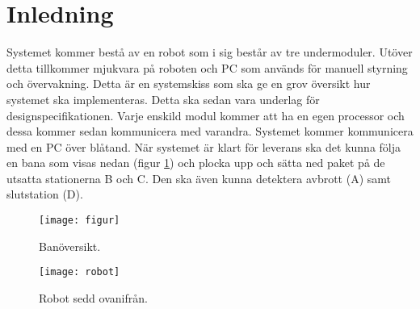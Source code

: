 \section{Inledning}
Systemet kommer bestå av en robot som i sig består av tre undermoduler. Utöver detta tillkommer mjukvara på roboten och PC som används för manuell styrning och övervakning. Detta är en systemskiss som ska ge en grov översikt hur systemet ska implementeras. Detta ska sedan vara underlag för designspecifikationen. 
\newline
\newline
Varje enskild modul kommer att ha en egen processor och dessa kommer sedan kommunicera med varandra. Systemet kommer kommunicera med en PC över blåtand. När systemet är klart för leverans ska det kunna följa en bana som visas nedan (figur \ref{systemskiss:banoversikt}) och plocka upp och sätta ned paket på de utsatta stationerna B och C. Den ska även kunna detektera avbrott (A) samt slutstation (D). 

\begin{figure}[h]
\center
\texttt{[image: figur]}
\caption{Banöversikt.} \label{systemskiss:banoversikt}
\end{figure}

\begin{figure}[h]
\center
\texttt{[image: robot]}
\caption{Robot sedd ovanifrån.}
\end{figure}

